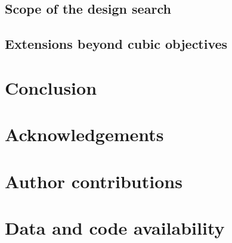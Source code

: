 \documentclass[a4paper,onecolumn,11pt,unpublished]{quantumarticle}
\newcommand{\blankcontent}{\noindent\mbox{}\par}
\theoremstyle{remark}
\begin{document}
\subsection{Scope of the design search}
\label{sec:discussion-search-scope}



\subsection{Extensions beyond cubic objectives}

\section{Conclusion}
\label{sec:conclusion}



\section*{Acknowledgements}
\blankcontent

\section*{Author contributions}
\blankcontent

\section*{Data and code availability}
\blankcontent
\end{document}
